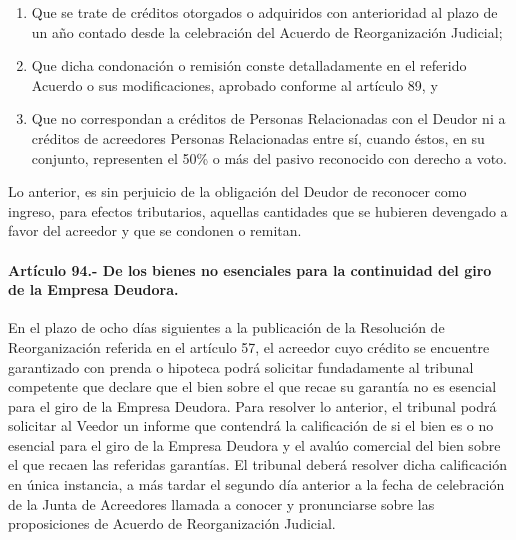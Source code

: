 \documentclass[
]{book}
\begin{document}
\begin{enumerate}
\def\labelenumi{\arabic{enumi})}
\item
  Que se trate de créditos otorgados o adquiridos con anterioridad al plazo de un año contado desde la celebración del Acuerdo de Reorganización Judicial;
\item
  Que dicha condonación o remisión conste detalladamente en el referido Acuerdo o sus modificaciones, aprobado conforme al artículo 89, y
\item
  Que no correspondan a créditos de Personas Relacionadas con el Deudor ni a créditos de acreedores Personas Relacionadas entre sí, cuando éstos, en su conjunto, representen el 50\% o más del pasivo reconocido con derecho a voto.
\end{enumerate}

Lo anterior, es sin perjuicio de la obligación del Deudor de reconocer como ingreso, para efectos tributarios, aquellas cantidades que se hubieren devengado a favor del acreedor y que se condonen o remitan.

\hypertarget{artuxedculo-94.--de-los-bienes-no-esenciales-para-la-continuidad-del-giro-de-la-empresa-deudora.}{%
\paragraph*{Artículo 94.- De los bienes no esenciales para la continuidad del giro de la Empresa Deudora.}\label{artuxedculo-94.--de-los-bienes-no-esenciales-para-la-continuidad-del-giro-de-la-empresa-deudora.}}

En el plazo de ocho días siguientes a la publicación de la Resolución de Reorganización referida en el artículo 57, el acreedor cuyo crédito se encuentre garantizado con prenda o hipoteca podrá solicitar fundadamente al tribunal competente que declare que el bien sobre el que recae su garantía no es esencial para el giro de la Empresa Deudora. Para resolver lo anterior, el tribunal podrá solicitar al Veedor un informe que contendrá la calificación de si el bien es o no esencial para el giro de la Empresa Deudora y el avalúo comercial del bien sobre el que recaen las referidas garantías. El tribunal deberá resolver dicha calificación en única instancia, a más tardar el segundo día anterior a la fecha de celebración de la Junta de Acreedores llamada a conocer y pronunciarse sobre las proposiciones de Acuerdo de Reorganización Judicial.
\end{document}
